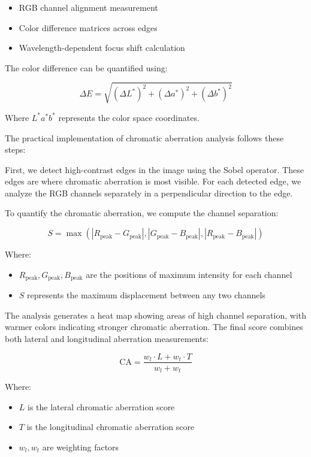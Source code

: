 \begin{itemize}
    \item RGB channel alignment measurement
    \item Color difference matrices across edges
    \item Wavelength-dependent focus shift calculation
\end{itemize}

The color difference can be quantified using:

\begin{equation}
\Delta E = \sqrt{(\Delta L^*)^2 + (\Delta a^*)^2 + (\Delta b^*)^2}
\end{equation}

Where \( L^*a^*b^* \) represents the color space coordinates.

The practical implementation of chromatic aberration analysis follows these steps:

First, we detect high-contrast edges in the image using the Sobel operator. These edges are where chromatic aberration is most visible. For each detected edge, we analyze the RGB channels separately in a perpendicular direction to the edge.

To quantify the chromatic aberration, we compute the channel separation:

\begin{equation}
S = \max\left(|R_{\text{peak}} - G_{\text{peak}}|, |G_{\text{peak}} - B_{\text{peak}}|, |R_{\text{peak}} - B_{\text{peak}}|\right)
\end{equation}

Where:
\begin{itemize}
    \item \( R_{\text{peak}}, G_{\text{peak}}, B_{\text{peak}} \) are the positions of maximum intensity for each channel
    \item \( S \) represents the maximum displacement between any two channels
\end{itemize}

The analysis generates a heat map showing areas of high channel separation, with warmer colors indicating stronger chromatic aberration. The final score combines both lateral and longitudinal aberration measurements:

\begin{equation}
\text{CA} = \frac{w_l \cdot L + w_t \cdot T}{w_l + w_t}
\end{equation}

Where:
\begin{itemize}
    \item \( L \) is the lateral chromatic aberration score
    \item \( T \) is the longitudinal chromatic aberration score
    \item \( w_l, w_t \) are weighting factors
\end{itemize}

